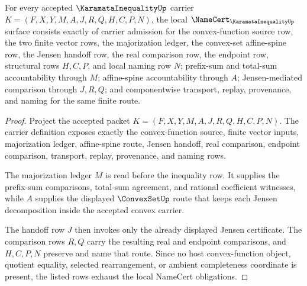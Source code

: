 \begin{theorem}
\label{thm:karamata-inequality-namecert-obligations}
For every accepted $\KaramataInequalityUp$ carrier $K=(F,X,Y,M,A,J,R,Q,H,C,P,N)$, the local $\NameCert_{\KaramataInequalityUp}$ surface consists exactly of carrier admission for the convex-function source row, the two finite vector rows, the majorization ledger, the convex-set affine-spine row, the Jensen handoff row, the real comparison row, the endpoint row, structural rows $H,C,P$, and local naming row $N$; prefix-sum and total-sum accountability through $M$; affine-spine accountability through $A$; Jensen-mediated comparison through $J,R,Q$; and componentwise transport, replay, provenance, and naming for the same finite route.
\end{theorem}
\begin{proof}
Project the accepted packet $K=(F,X,Y,M,A,J,R,Q,H,C,P,N)$. The carrier definition exposes exactly the convex-function source, finite vector inputs, majorization ledger, affine-spine route, Jensen handoff, real comparison, endpoint comparison, transport, replay, provenance, and naming rows.

The majorization ledger $M$ is read before the inequality row. It supplies the prefix-sum comparisons, total-sum agreement, and rational coefficient witnesses, while $A$ supplies the displayed $\ConvexSetUp$ route that keeps each Jensen decomposition inside the accepted convex carrier.

The handoff row $J$ then invokes only the already displayed Jensen certificate. The comparison rows $R,Q$ carry the resulting real and endpoint comparisons, and $H,C,P,N$ preserve and name that route. Since no host convex-function object, quotient equality, selected rearrangement, or ambient completeness coordinate is present, the listed rows exhaust the local NameCert obligations.
\end{proof}

